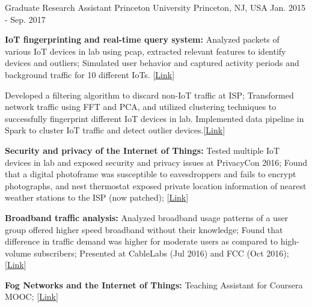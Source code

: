 \begin{cventries}
  \cventry
    {Graduate Research Assistant} %
    {Princeton University} %
    {Princeton, NJ, USA} %
    {Jan. 2015 - Sep. 2017} %
    {
      \begin{cvitems} %
     \item {\textbf{IoT fingerprinting and real-time query system:} Analyzed packets of various IoT devices in lab using pcap, extracted relevant features to identify devices and outliers; Simulated user behavior and captured activity periods and background traffic for 10 different IoTs. \hfill [\href{https://github.com/shahifaqeer/iot-dns}{Link}]}
    \item {Developed a filtering algorithm to discard non-IoT traffic at ISP; Transformed network traffic using FFT and PCA, and utilized clustering techniques to successfully fingerprint different IoT devices in lab. Implemented data pipeline in Spark to cluster IoT traffic and detect outlier devices.\hfill [\href{https://github.com/shahifaqeer/oit-dns}{Link}]}
    \item {\textbf{Security and privacy of the Internet of Things:} Tested multiple IoT devices in lab and exposed security and privacy issues at PrivacyCon 2016; Found that a digital photoframe was susceptible to eavesdroppers and fails to encrypt photographs, and nest thermostat exposed private location information of nearest weather stations to the ISP (now patched); \hfill[\href{https://www.cs.princeton.edu/news/citp-stitching-internet-things}{Link}]}
    \item {\textbf{Broadband traffic analysis:} Analyzed broadband usage patterns of a user group offered higher speed broadband without their knowledge; Found that difference in traffic demand was higher for moderate users as compared to high-volume subscribers; Presented at CableLabs (Jul 2016) and FCC (Oct 2016);\hfill [\href{https://www.youtube.com/watch?v=9QiovWtGtq0}{Link}]}
    \item {\textbf{Fog Networks and the Internet of Things:} Teaching Assistant for Coursera MOOC; \hfill [\href{https://online.princeton.edu/course/fog-networks-and-internet-things}{Link}]}

\end{cvitems}}
\end{cventries}
